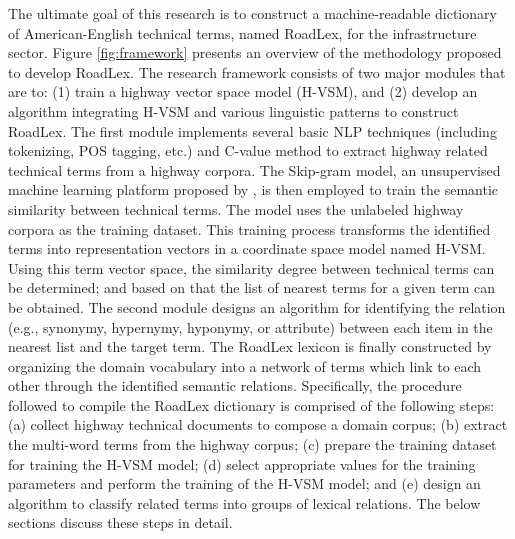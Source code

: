 \documentclass[Journal, BackFigs, DoubleSpace]{ascelike}%
\begin{document}
The ultimate goal of this research is to construct a machine-readable dictionary of American-English technical terms, named RoadLex, for the infrastructure sector. Figure \ref{fig:framework} presents an overview of the methodology proposed to develop RoadLex. The research framework consists of two major modules that are to: (1) train a highway vector space model (H-VSM), and (2) develop an algorithm integrating H-VSM and various linguistic patterns to construct RoadLex. The first module implements several basic NLP techniques (including tokenizing, POS tagging, etc.) and C-value method \cite{frantzi20} to extract highway related technical terms from a highway corpora. The Skip-gram model, an unsupervised machine learning platform proposed by , is then employed to train the semantic similarity between technical terms. The model uses the unlabeled highway corpora as the training dataset. This training process transforms the identified terms into representation vectors in a coordinate space model named H-VSM.  Using this term vector space, the similarity degree between technical terms can be determined; and based on that the list of nearest terms for a given term can be obtained. The second module designs an algorithm for identifying the relation (e.g., synonymy, hypernymy, hyponymy, or attribute) between each item in the nearest list and the target term. The RoadLex lexicon is finally constructed by organizing the domain vocabulary into a network of terms which link to each other through the identified semantic relations. Specifically, the procedure followed to compile the RoadLex dictionary is comprised of the following steps: (a) collect highway technical documents to compose a domain corpus; (b) extract the multi-word terms from the highway corpus; (c) prepare the training dataset for training the H-VSM model; (d) select appropriate values for the training parameters and perform the training of the H-VSM model; and (e) design an algorithm to classify related terms into groups of lexical relations. The below sections discuss these steps in detail.

%
%
\end{document}
